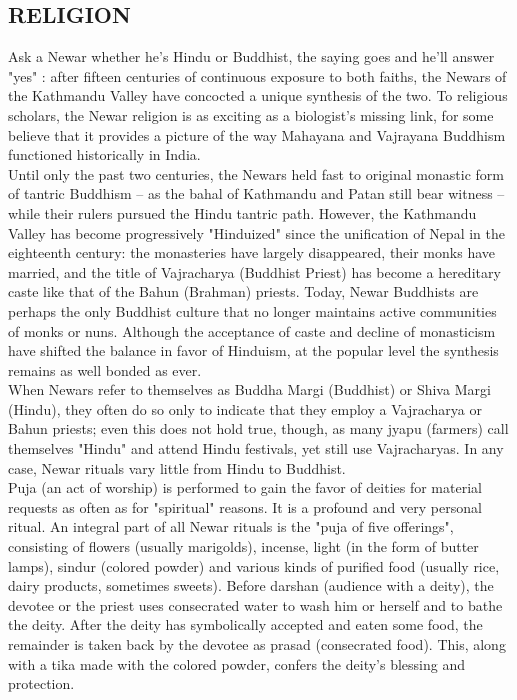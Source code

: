 \documentclass[a4paper,13pt, margin=0.9in]{article}
\begin{document}
\begin{flushleft}
\newpage

	\subsection{RELIGION}
	Ask a Newar whether he's Hindu or Buddhist, the saying goes and he'll answer "yes" : after fifteen centuries of continuous exposure to both faiths, the Newars of the Kathmandu Valley have concocted a unique synthesis of the two. To religious scholars, the Newar religion is as exciting as a biologist's missing link, for some believe that it provides a picture of the way Mahayana and Vajrayana Buddhism functioned historically in India.\\

Until only the past two centuries, the Newars held fast to original monastic form of tantric Buddhism – as the bahal of Kathmandu and Patan still bear witness – while their rulers pursued the Hindu tantric path. However, the Kathmandu Valley has become progressively "Hinduized" since the unification of Nepal in the eighteenth century: the monasteries have largely disappeared, their monks have married, and the title of Vajracharya (Buddhist Priest) has become a hereditary caste like that of the Bahun (Brahman) priests. Today, Newar Buddhists are perhaps the only Buddhist culture that no longer maintains active communities of monks or nuns. Although the acceptance of caste and decline of monasticism have shifted the balance in favor of Hinduism, at the popular level the synthesis remains as well bonded as ever.\\

When Newars refer to themselves as Buddha Margi (Buddhist) or Shiva Margi (Hindu), they often do so only to indicate that they employ a Vajracharya or Bahun priests; even this does not hold true, though, as many jyapu (farmers) call themselves "Hindu" and attend Hindu festivals, yet still use Vajracharyas. In any case, Newar rituals vary little from Hindu to Buddhist.\\

Puja (an act of worship) is performed to gain the favor of deities for material requests as often as for "spiritual" reasons. It is a profound and very personal ritual. An integral part of all Newar rituals is the "puja of five offerings", consisting of flowers (usually marigolds), incense, light (in the form of butter lamps), sindur (colored powder) and various kinds of purified food (usually rice, dairy products, sometimes sweets). Before darshan (audience with a deity), the devotee or the priest uses consecrated water to wash him or herself and to bathe the deity. After the deity has symbolically accepted and eaten some food, the remainder is taken back by the devotee as prasad (consecrated food). This, along with a tika made with the colored powder, confers the deity's blessing and protection.\\


\end{flushleft}
\end{document}

